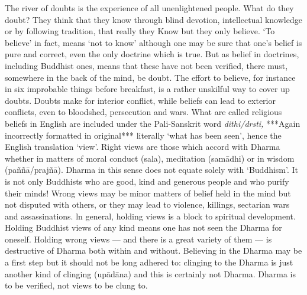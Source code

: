 The river of doubts is the experience of all unenlightened people. What do they doubt? They think that they know through blind devotion, intellectual knowledge or by following tradition, that really they Know but they only believe. `To believe' in fact, means `not to know' although one may be sure that one's belief is pure and correct, even the only doctrine which is true. But as belief in doctrines, including Buddhist ones, means that these have not been verified, there must, somewhere in the back of the mind, be doubt. The effort to believe, for instance in six improbable things before breakfast, is a rather unskilful way to cover up doubts. Doubts make for interior conﬂict, while beliefs can lead to exterior conflicts, even to bloodshed, persecution and wars. What are called religious beliefs in English are included under the Pali-Sanskrit word \textit{dithi/drsti,} ***Again incorrectly formatted in original*** literally `what has been seen', hence the English translation `view'. Right views are those which accord with Dharma whether in matters of moral conduct (sala), meditation (sam\=adhi) or in wisdom (pa\~n\~n\=a/praj\~n\=a). Dharma in this sense does not equate solely with `Buddhism'. It is not only Buddhists who are good, kind and generous people and who purify their minds! Wrong views may be minor matters of belief held in the mind but not disputed with others, or they may lead to violence, killings, sectarian wars and assassinations. ln general, holding views is a block to spiritual development. Holding Buddhist views of any kind means one has not seen the Dharma for oneself. Holding wrong views — and there is a great variety of them — is destructive of Dharma both within and without. Believing in
the Dharma may be a first step but it should not be long adhered to: clinging to the Dharma is just another kind of clinging (up\=ad\=ana) and this is certainly not Dharma. Dharma is to be veriﬁed, not views to be clung to.\\

